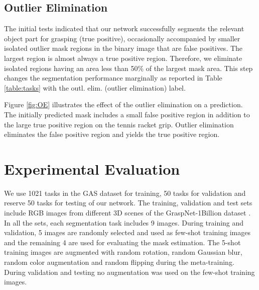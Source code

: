 \documentclass[letterpaper]{article} %
\begin{document}
\subsection{Outlier Elimination}
The initial tests indicated that our network successfully segments the relevant object part for grasping (true positive), occasionally accompanied by smaller isolated outlier mask regions in the binary image that are false positives. The largest region is almost always a true positive region. Therefore, we eliminate isolated regions having an area less than 50\% of the largest mask area. This step changes the segmentation performance marginally as reported in Table \ref{table:tasks} with the outl. elim. (outlier elimination) label.

Figure \ref{fig:OE} illustrates the effect of the outlier elimination on a prediction. The initially predicted mask includes a small false positive region in addition to the large true positive region on the tennis racket grip. Outlier elimination eliminates the false positive region and yields the true positive region.

\section{Experimental Evaluation}
\label{sec:experiment}

We use 1021 tasks in the GAS dataset for training, 50 tasks for validation and reserve 50 tasks for testing of our network. The training, validation and test sets include RGB images from different 3D scenes of the GraspNet-1Billion dataset \cite{fang2020graspnet}. In all the sets, each segmentation task includes 9 images. During training and validation, 5 images are randomly selected and used as few-shot training images and the remaining 4 are used for evaluating the mask estimation. The 5-shot training images are augmented with random rotation, random Gaussian blur, random color augmentation and random flipping during the meta-training. During validation and testing no augmentation was used on the few-shot training images.
\end{document}
